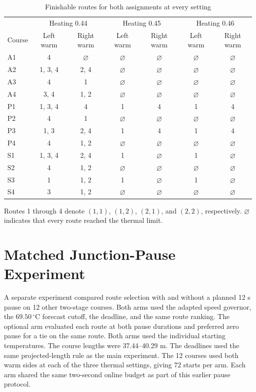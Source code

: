 \documentclass{ieeeaccess}
\begin{document}
\begin{table}[!t]
\caption{Finishable routes for both assignments at every setting}
\label{tab:finishable-routes}
\centering
\footnotesize
\setlength{\tabcolsep}{8pt}
\renewcommand{\arraystretch}{1.12}
\begin{tabular}{@{}lcccccc@{}}
\hline
& \multicolumn{2}{c}{Heating 0.44} & \multicolumn{2}{c}{Heating 0.45} & \multicolumn{2}{c}{Heating 0.46} \\
Course & Left warm & Right warm & Left warm & Right warm & Left warm & Right warm \\
\hline
A1 & 4 & $\varnothing$ & $\varnothing$ & $\varnothing$ & $\varnothing$ & $\varnothing$ \\
A2 & 1, 3, 4 & 2, 4 & $\varnothing$ & $\varnothing$ & $\varnothing$ & $\varnothing$ \\
A3 & 4 & 1 & $\varnothing$ & $\varnothing$ & $\varnothing$ & $\varnothing$ \\
A4 & 3, 4 & 1, 2 & $\varnothing$ & $\varnothing$ & $\varnothing$ & $\varnothing$ \\
P1 & 1, 3, 4 & 4 & 1 & 4 & 1 & 4 \\
P2 & 4 & 1 & $\varnothing$ & $\varnothing$ & $\varnothing$ & $\varnothing$ \\
P3 & 1, 3 & 2, 4 & 1 & 4 & 1 & 4 \\
P4 & 4 & 1, 2 & $\varnothing$ & $\varnothing$ & $\varnothing$ & $\varnothing$ \\
S1 & 1, 3, 4 & 2, 4 & 1 & $\varnothing$ & 1 & $\varnothing$ \\
S2 & 4 & 1, 2 & $\varnothing$ & $\varnothing$ & $\varnothing$ & $\varnothing$ \\
S3 & 1 & 1, 2 & 1 & $\varnothing$ & 1 & $\varnothing$ \\
S4 & 3 & 1, 2 & $\varnothing$ & $\varnothing$ & $\varnothing$ & $\varnothing$ \\
\hline
\end{tabular}
\smallskip
\parbox{0.93\textwidth}{Routes 1 through 4 denote $(1,1)$, $(1,2)$, $(2,1)$, and $(2,2)$, respectively. $\varnothing$ indicates that every route reached the thermal limit.}
\end{table}

\section{Matched Junction-Pause Experiment}
\label{app:pause}

A separate experiment compared route selection with and without a planned 12 s pause on 12 other two-stage courses. Both arms used the adapted speed governor, the $69.50\,{}^\circ\mathrm{C}$ forecast cutoff, the deadline, and the same route ranking. The optional arm evaluated each route at both pause durations and preferred zero pause for a tie on the same route. Both arms used the individual starting temperatures. The course lengths were 37.44--40.29 m. The deadlines used the same projected-length rule as the main experiment. The 12 courses used both warm sides at each of the three thermal settings, giving 72 starts per arm. Each arm shared the same two-second online budget as part of this earlier pause protocol.
\end{document}
